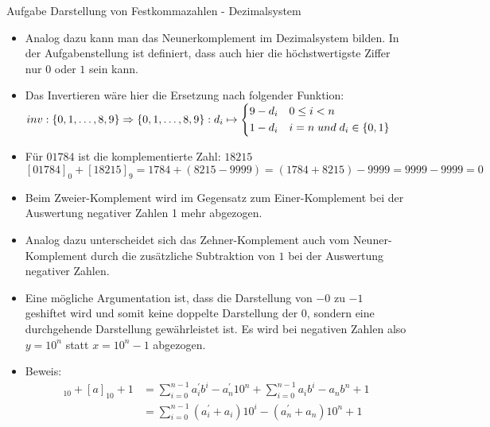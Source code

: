 \begin{frame}[allowframebreaks]{Aufgabe \thesection}{Darstellung von Festkommazahlen - Dezimalsystem}
\begin{solution}
\begin{itemize}
invertiert.
      \item Analog dazu kann man das Neunerkomplement im Dezimalsystem bilden. In der Aufgabenstellung ist definiert, dass auch hier die höchstwertigste Ziffer nur $0$ oder $1$ sein kann. 
      \item Das Invertieren wäre hier die Ersetzung nach folgender Funktion:\\[0.25cm] $inv : \{0, 1, \ldots, 8, 9\} \Rightarrow \{0, 1, \ldots, 8, 9\} : d_i \mapsto \begin{dcases}
          9-d_i & 0\le i < n \\
          1-d_i & i = n\;und\;d_i\in\{0, 1\}
        \end{dcases}
        $
      \item Für $01784$ ist die komplementierte Zahl: $18215$\\[0.25cm]
        $[01784]_{0}+[18215]_{9}=1784+(8215-9999)=(1784+8215)-9999=9999-9999=0$
    \end{itemize}
  \end{solution}
  \begin{solutionnoinc}
    \begin{itemize}
        \item Beim Zweier-Komplement wird im Gegensatz zum Einer-Komplement bei der Auswertung negativer Zahlen 1 mehr abgezogen. 
        \item Analog dazu unterscheidet sich das Zehner-Komplement auch vom Neuner-Komplement durch die zusätzliche Subtraktion von $1$ bei der Auswertung negativer Zahlen. 
        \item Eine mögliche Argumentation ist, dass die Darstellung von $-0$ zu $-1$ geshiftet wird und somit keine doppelte Darstellung der $0$, sondern eine durchgehende Darstellung gewährleistet ist. Es wird bei negativen Zahlen also $y = 10^n$ statt $x = 10^n - 1$ abgezogen.
    \end{itemize}
  \end{solutionnoinc}
  \begin{solution}
    \begin{itemize}
        \item \alert{Beweis:}
        \tiny
        \begin{align*}
            [a^{\prime}]_{10}+[a]_{10}+1&=\sum_{i=0}^{n-1}a_{i}^{\prime}b^{i}-a_{n}^{\prime}10^{n}+\sum_{i=0}^{n-1}a_{i}b^{i}-a_{n}b^{n}+1\\
            &=\sum_{i=0}^{n-1}(a_{i}^{\prime}+a_{i}){10^{i}}-(a_{n}^{\prime}+a_{n}){10^{n}}+1\\

\end{align*}
\end{itemize}
\end{solution}
\end{frame}
